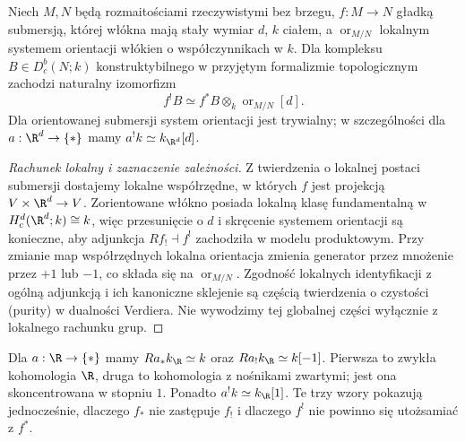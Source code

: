 \begin{twierdzenie}
\label{thm:xvi-smooth-purity}
Niech $M,N$ będą rozmaitościami rzeczywistymi bez brzegu,
$f:M\to N$ gładką submersją, której włókna mają stały
wymiar $d$, $k$ ciałem, a
$\operatorname{or}_{M/N}$ lokalnym systemem orientacji
włókien o współczynnikach w $k$.
Dla kompleksu $B\in D^b_c(N;k)$ konstruktybilnego
w przyjętym formalizmie topologicznym zachodzi
naturalny izomorfizm
\[
 f^!B\simeq f^*B\otimes_k\operatorname{or}_{M/N}[d].
\]
Dla orientowanej submersji system orientacji jest trywialny;
w szczególności dla $a:\R^d\to\{*\}$ mamy
$a^!k\simeq k_{\R^d}[d]$.
\end{twierdzenie}
\begin{proof}[Rachunek lokalny i zaznaczenie zależności]
Z twierdzenia o lokalnej postaci submersji dostajemy
lokalne współrzędne, w których $f$ jest projekcją
$V\times\R^d\to V$. Zorientowane włókno posiada lokalną
klasę fundamentalną w
$H_c^d(\R^d;k)\cong k$, więc przesunięcie o $d$
i skręcenie systemem orientacji są konieczne, aby
adjunkcja $Rf_!\dashv f^!$ zachodziła w modelu
produktowym. Przy zmianie map współrzędnych lokalna orientacja
zmienia generator przez mnożenie przez $+1$ lub $-1$,
co składa się na $\operatorname{or}_{M/N}$.
Zgodność lokalnych identyfikacji z ogólną adjunkcją i
ich kanoniczne sklejenie są częścią twierdzenia o
czystości (purity) w dualności Verdiera. Nie wywodzimy
tej globalnej części wyłącznie z lokalnego rachunku grup.
\end{proof}
\begin{przyklad}
Dla $a:\R\to\{*\}$ mamy
$Ra_*k_{\R}\simeq k$ oraz $Ra_!k_{\R}\simeq k[-1]$.
Pierwsza to zwykła kohomologia $\R$, druga to
kohomologia z nośnikami zwartymi; jest ona skoncentrowana
w stopniu $1$. Ponadto $a^!k\simeq k_{\R}[1]$.
Te trzy wzory pokazują jednocześnie, dlaczego
$f_*$ nie zastępuje $f_!$ i dlaczego $f^!$
nie powinno się utożsamiać z $f^*$.
\end{przyklad}

